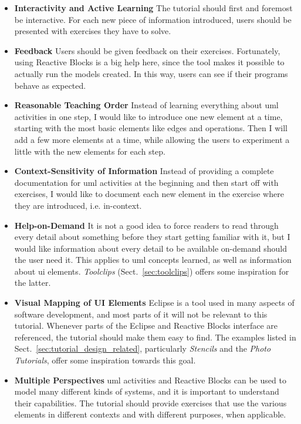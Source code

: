 \begin{itemize}
	\item{\textbf{Interactivity and Active Learning}} The tutorial should first and foremost be interactive. For each new piece of information introduced, users should be presented with exercises they have to solve.
	\item{\textbf{Feedback}} Users should be given feedback on their exercises. Fortunately, using Reactive Blocks is a big help here, since the tool makes it possible to actually run the models created. In this way, users can see if their programs behave as expected.
	\item{\textbf{Reasonable Teaching Order}} Instead of learning everything about \gls{uml} activities in one step, I would like to introduce one new element at a time, starting with the most basic elements like edges and operations. Then I will add a few more elements at a time, while allowing the users to experiment a little with the new elements for each step.
	\item{\textbf{Context-Sensitivity of Information}} Instead of providing a complete documentation for \gls{uml} activities at the beginning and then start off with exercises, I would like to document each new element in the exercise where they are introduced, i.e. in-context.
	\item{\textbf{Help-on-Demand}} It is not a good idea to force readers to read through every detail about something before they start getting familiar with it, but I would like information about every detail to be available on-demand should the user need it. This applies to \gls{uml} concepts learned, as well as information about \gls{ui} elements. \emph{Toolclips} (Sect.~\ref{sec:toolclips}) offers some inspiration for the latter.
	\item{\textbf{Visual Mapping of UI Elements}} Eclipse is a tool used in many aspects of software development, and most parts of it will not be relevant to this tutorial. Whenever parts of the Eclipse and Reactive Blocks interface are referenced, the tutorial should make them easy to find. The examples listed in Sect.~\ref{sec:tutorial_design_related}, particularly \emph{Stencils} and the \emph{Photo Tutorials}, offer some inspiration towards this goal.
	\item{\textbf{Multiple Perspectives}} \gls{uml} activities and Reactive Blocks can be used to model many different kinds of systems, and it is important to understand their capabilities. The tutorial should provide exercises that use the various elements in different contexts and with different purposes, when applicable.

\end{itemize}
